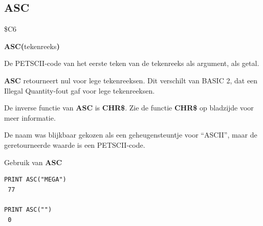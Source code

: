 
\newpage
\subsection{ASC}
\begin{description}[leftmargin=2cm,style=nextline]
\item [Token:]    \$C6

\item [Formaat:]   {\bf ASC(}tekenreeks{\bf)}

\item [Retourneert:]  De PETSCII-code van het eerste teken van de tekenreeks als argument, als getal.

\item [Opmerkingen:]  {\bf ASC} retourneert nul voor lege tekenreeksen. Dit verschilt van BASIC 2, dat een Illegal Quantity-fout gaf voor lege tekenreeksen.

                  De inverse functie van {\bf ASC} is {\bf CHR\$}. Zie de functie {\bf CHR\$} op bladzijde \pageref{BASIC 65 Functions!CHR} voor meer informatie.

                  De naam was blijkbaar gekozen als een geheugensteuntje voor ``ASCII'', maar de geretourneerde waarde is een PETSCII-code.

\item [Voorbeelden:] Gebruik van {\bf ASC}

\begin{tcolorbox}[colback=black,coltext=white]
\verbatimfont{\codefont}
\begin{verbatim}
PRINT ASC("MEGA")
 77

PRINT ASC("")
 0
\end{verbatim}
\end{tcolorbox}
\end{description}


\newpage
